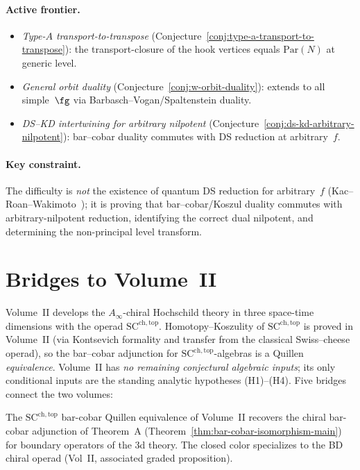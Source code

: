 \paragraph{Active frontier.}
\begin{itemize}
\item \emph{Type-$A$ transport-to-transpose}
  (Conjecture~\ref{conj:type-a-transport-to-transpose}):
  the transport-closure of the hook vertices equals
  $\mathrm{Par}(N)$ at generic level.
\item \emph{General orbit duality}
  (Conjecture~\ref{conj:w-orbit-duality}):
  extends to all simple~$\fg$ via Barbasch--Vogan/Spaltenstein
  duality.
\item \emph{DS--KD intertwining for arbitrary nilpotent}
  (Conjecture~\ref{conj:ds-kd-arbitrary-nilpotent}):
  bar--cobar duality commutes with DS reduction at arbitrary~$f$.
\end{itemize}

\paragraph{Key constraint.}
The difficulty is \emph{not} the existence of quantum DS
reduction for arbitrary~$f$ (Kac--Roan--Wakimoto~\cite{KRW});
it is proving that bar--cobar/Koszul duality commutes with
arbitrary-nilpotent reduction, identifying the correct dual
nilpotent, and determining the non-principal level transform.


\section{Bridges to Volume~II}
\label{sec:cross-volume-bridges}

Volume~II develops the $A_\infty$-chiral Hochschild theory in
three space-time dimensions with the operad
$\mathrm{SC}^{\mathrm{ch,top}}$.  Homotopy--Koszulity of
$\mathrm{SC}^{\mathrm{ch,top}}$ is proved in Volume~II
(via Kontsevich formality and transfer from the classical
Swiss--cheese operad), so the bar--cobar adjunction for
$\mathrm{SC}^{\mathrm{ch,top}}$-algebras is a Quillen
\emph{equivalence}.  Volume~II has \emph{no remaining conjectural
algebraic inputs}; its only conditional inputs are the
standing analytic hypotheses (H1)--(H4).
Five bridges connect the two volumes:

\begin{proposition}
\label{conj:vol2-bar-cobar-bridge}
The $\mathrm{SC}^{\mathrm{ch,top}}$ bar-cobar Quillen equivalence of
Volume~II recovers the chiral bar-cobar adjunction of Theorem~A
(Theorem~\ref{thm:bar-cobar-isomorphism-main}) for boundary
operators of the 3d theory.  The closed color specializes to the BD
chiral operad (Vol~II, associated graded proposition).
\end{proposition}

